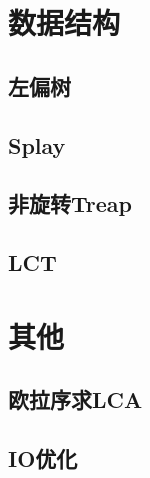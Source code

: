 \documentclass[a4paper,12pt]{article}
\begin{document}
\section{数据结构}

\subsection{左偏树}

\subsection{Splay}

\subsection{非旋转Treap}

\subsection{LCT}


\section{其他}

\subsection{欧拉序求LCA}

\subsection{IO优化}



\label{LastPage}
\end{document}
